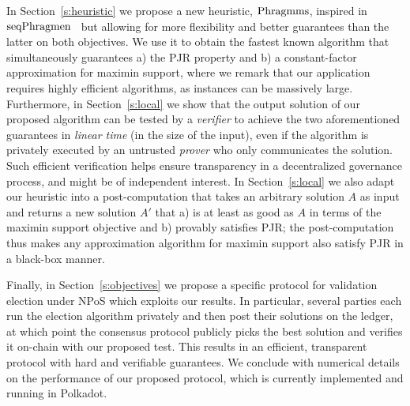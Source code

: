 In Section~\ref{s:heuristic} we propose a new heuristic, $\operatorname{Phragmms}$, inspired in $\operatorname{seqPhragmen}$~\cite{brill2017phragmen} but allowing for more flexibility and better guarantees than the latter on both objectives. We use it to obtain the fastest known algorithm that simultaneously guarantees a) the PJR property and b) a constant-factor approximation for maximin support, where we remark that our application requires highly efficient algorithms, as instances can be massively large. 
%
Furthermore, in Section~\ref{s:local} we show that the output solution of our proposed algorithm can be tested by a \emph{verifier} to achieve the two aforementioned guarantees in \emph{linear time} (in the size of the input), even if the algorithm is privately executed by an untrusted \emph{prover} who only communicates the solution. Such efficient verification helps ensure transparency in a decentralized governance process, and might be of independent interest. 
%
In Section~\ref{s:local} we also adapt our heuristic into a post-computation that takes an arbitrary solution $A$ as input and returns a new solution $A'$ that a) is at least as good as $A$ in terms of the maximin support objective and b) provably satisfies PJR; the post-computation thus makes any approximation algorithm for maximin support also satisfy PJR in a black-box manner.

Finally, in Section~\ref{s:objectives} we propose a specific protocol for validation election under NPoS which exploits our results. 
In particular, several parties each run the election algorithm privately 
and then post their solutions on the ledger, at which point the consensus protocol publicly picks the best solution and verifies it on-chain with our proposed test. 
This results in an efficient, transparent protocol with hard and verifiable guarantees. 
We conclude with numerical details on the performance of our proposed protocol, which is currently implemented and running in Polkadot.